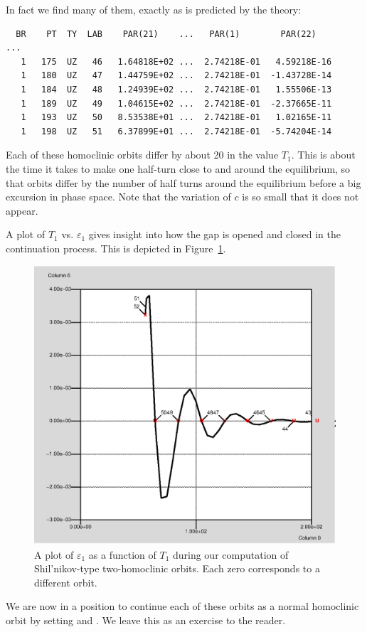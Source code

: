 \documentclass[12pt]{report}
\begin{document}
In fact we find many of them, exactly as is predicted by the theory:
\begin{verbatim}
  BR    PT  TY  LAB    PAR(21)    ...   PAR(1)        PAR(22)
... 
   1   175  UZ   46   1.64818E+02 ...  2.74218E-01   4.59218E-16
   1   180  UZ   47   1.44759E+02 ...  2.74218E-01  -1.43728E-14
   1   184  UZ   48   1.24939E+02 ...  2.74218E-01   1.55506E-13
   1   189  UZ   49   1.04615E+02 ...  2.74218E-01  -2.37665E-11
   1   193  UZ   50   8.53538E+01 ...  2.74218E-01   1.02165E-11
   1   198  UZ   51   6.37899E+01 ...  2.74218E-01  -5.74204E-14
\end{verbatim}
Each of these homoclinic orbits differ 
by about 20 in the value $T_1$. This is about 
the time it takes to make one half-turn close to and
around the equilibrium, so that orbits differ by the number of 
half turns around the equilibrium before a big excursion
in phase space. Note that the variation of 
$c$ is so small that it does not appear.

A plot of $T_1$ vs. $\varepsilon_1$ gives insight into how the gap
is opened and closed in the continuation process. This is depicted in 
Figure~\ref{shilgap}.
\begin{figure}[htb]
\begin{center}
\includegraphics[scale=0.5]{include/shilgap.eps}
\caption{A plot of $\varepsilon_1$ as a function of $T_1$ 
during our computation of Shil'nikov-type two-homoclinic orbits. 
Each zero corresponds to a different orbit.}
\label{shilgap}
\end{center}
\end{figure}
We are now in a
position to continue each of these orbits as a
normal homoclinic orbit by setting  and
. We leave
this as an exercise to the reader.
\end{document}
